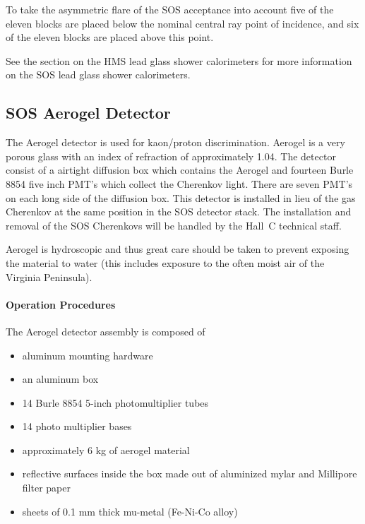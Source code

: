 \begin{obsolete}
To take the asymmetric flare of the SOS acceptance into account five of the
eleven blocks are placed below the nominal central ray point of incidence,
and six of the eleven blocks are placed above this point.

See the section on the HMS lead glass shower calorimeters for
 more information on the SOS lead glass
shower calorimeters.


\subsection{SOS Aerogel Detector }

The Aerogel detector is used for kaon/proton discrimination.
Aerogel is a very porous glass with an index of refraction of approximately
1.04.
The detector consist of a airtight diffusion box which contains the
Aerogel and fourteen Burle 8854 five inch PMT's which collect
the Cherenkov light. There are seven PMT's on each long side of the diffusion
box.
This detector is installed in lieu of the gas Cherenkov
at the same position in the SOS detector stack. The installation and
removal of the SOS Cherenkovs will be handled by the Hall~C technical staff.

Aerogel is hydroscopic and thus great care should be taken to prevent
exposing the material to water (this includes exposure to the often moist
air of the Virginia Peninsula).


\paragraph{Operation Procedures}

The Aerogel detector assembly is composed of

\begin{itemize}
\item{aluminum mounting hardware}
\item{an aluminum box}
\item{14 Burle 8854 5-inch photomultiplier tubes}
\item{14 photo multiplier bases}
\item{approximately 6 kg of aerogel material}
\item{reflective surfaces inside the box made out of
aluminized mylar and Millipore filter paper}
\item{sheets of 0.1 mm thick mu-metal (Fe-Ni-Co alloy)}
\end{itemize}


\end{obsolete}
